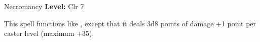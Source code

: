 {Necromancy}
{
	\textbf{Level:}
	Clr 7\\
}
{
	This spell functions like , except that it deals 3d8 points of damage +1 point per caster level (maximum +35).

}
